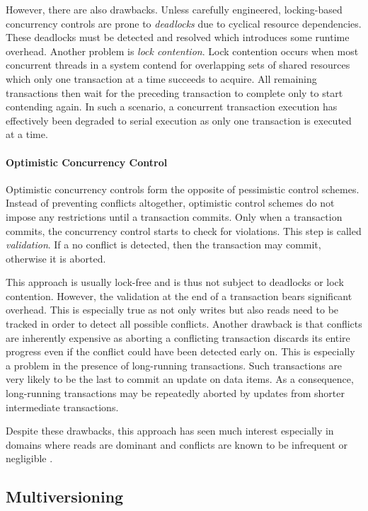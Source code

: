 However, there are also drawbacks. Unless carefully engineered, locking-based
concurrency controls are prone to \emph{deadlocks} due to cyclical resource
dependencies. These deadlocks must be detected and resolved which introduces
some runtime overhead. Another problem is \emph{lock contention}. Lock
contention occurs when most concurrent threads in a system contend for
overlapping sets of shared resources which only one transaction at a time
succeeds to acquire. All remaining transactions then wait for the preceding
transaction to complete only to start contending again. In such a scenario, a
concurrent transaction execution has effectively been degraded to serial
execution as only one transaction is executed at a time.

\paragraph{Optimistic Concurrency Control} %
Optimistic concurrency controls form the opposite of pessimistic control
schemes. Instead of preventing conflicts altogether, optimistic control schemes
do not impose any restrictions until a transaction commits. Only when a
transaction commits, the concurrency control starts to check for violations.
This step is called \emph{validation}. If a no conflict is detected, then the
transaction may commit, otherwise it is aborted.

This approach is usually lock-free and is thus not subject to deadlocks or lock
contention. However, the validation at the end of a transaction bears
significant overhead. This is especially true as not only writes but also reads
need to be tracked in order to detect all possible conflicts. Another drawback
is that conflicts are inherently expensive as aborting a conflicting transaction
discards its entire progress even if the conflict could have been detected early
on. This is especially a problem in the presence of long-running transactions.
Such transactions are very likely to be the last to commit an update on data
items. As a consequence, long-running transactions may be repeatedly aborted by
updates from shorter intermediate transactions.

Despite these drawbacks, this approach has seen much interest especially in
domains where reads are dominant and conflicts are known to be infrequent or
negligible \cite{kung1981optimistic, carey1986performance, larson2011high}.

\subsection{Multiversioning}

